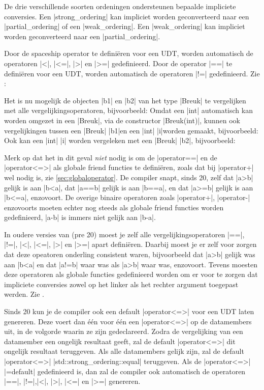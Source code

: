 \begin{cpplstShortInline}
De drie verschillende soorten ordeningen ondersteunen bepaalde impliciete conversies. Een |strong_ordering| kan impliciet worden geconverteerd naar een |partial_ordering| of een |weak_ordering|. Een |weak_ordering| kan impliciet worden geconverteerd naar een |partial_ordering|.

Door de spaceship operator te definiëren voor een UDT, worden automatisch de operatoren |<|, |<=|, |>| en |>=| gedefinieerd.
Door de operator |==| te definiëren voor een UDT, worden automatisch de operatoren |!=| gedefinieerd.
Zie :

Het is nu mogelijk de objecten |b1| en |b2| van het type |Breuk| te vergelijken met alle vergelijkingsoperatoren, bijvoorbeeld:
Omdat een |int| automatisch kan worden omgezet in een |Breuk|, via de constructor |Breuk(int)|, kunnen ook vergelijkingen tussen een |Breuk| |b1|en een |int| |i|worden gemaakt, bijvoorbeeld:
Ook kan een |int| |i| worden vergeleken met een |Breuk| |b2|, bijvoorbeeld:

Merk op dat het in dit geval \emph{niet} nodig is om de |operator==| en de |operator<=>| als globale friend functies te definiëren, zoals dat bij |operator+| wel nodig is, zie \cref{sec:globaloperator}.
De compiler snapt, sinds \Cpp{}20, zelf dat |a>b| gelijk is aan |b<a|, dat |a==b| gelijk is aan |b==a|, en dat |a>=b| gelijk is aan |b<=a|, enzovoort.
De overige binaire operatoren zoals |operator+|, |operator-| enzovoorts moeten echter nog steeds als globale friend functies worden gedefinieerd, |a-b| is immers niet gelijk aan |b-a|.

In oudere versies van \Cpp{} (pre \Cpp{}20) moest je zelf alle vergelijkingsoperatoren |==|, |!=|, |<|, |<=|, |>| en |>=| apart definiëren.
Daarbij moest je er zelf voor zorgen dat deze opeatoren onderling consistent waren, bijvoorbeeld dat |a>b| gelijk was aan |b<a| en dat |a!=b| waar was als |a>b| waar was, enzovoort.
Tevens moesten deze operatoren als globale functies gedefinieerd worden om er voor te zorgen dat impliciete conversies zowel op het linker als het rechter argument toegepast werden. Zie .

\label{sec:spaceship_default}
Sinds \Cpp{}20 kun je de compiler ook een default |operator<=>| voor een UDT laten genereren.
Deze voert dan één voor één een |operator<=>| op de datamembers uit, in de volgorde waarin ze zijn gedeclareerd.
Zodra de vergelijking van een datamember een ongelijk resultaat geeft, zal de default |operator<=>| dit ongelijk resultaat teruggeven.
Als alle datamembers gelijk zijn, zal de default |operator<=>| |std::strong_ordering::equal| teruggeven.
Als de |operator<=>| |=default| gedefinieerd is, dan zal de compiler ook automatisch de operatoren |==|, |!=|,|<|, |>|, |<=| en |>=| genereren.


\end{cpplstShortInline}
